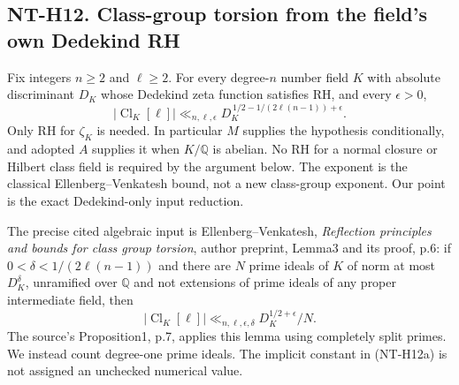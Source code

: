 \subsection*{NT-H12. Class-group torsion from the field's own Dedekind RH}
Fix integers $n\ge2$ and $\ell\ge2$. For every degree-$n$ number field
$K$ with absolute discriminant $D_K$ whose Dedekind zeta function satisfies
RH, and every $\epsilon>0$,
\[
 |\operatorname{Cl}_K[\ell]|
       \ll_{n,\ell,\epsilon}
 D_K^{\,1/2-1/(2\ell(n-1))+\epsilon}.                   \tag{NT-H12a}
\]
Only RH for $\zeta_K$ is needed. In particular $M$ supplies the hypothesis
conditionally, and adopted $A$ supplies it when $K/\mathbb Q$ is abelian.
No RH for a normal closure or Hilbert class field is required by the
argument below. The exponent is the classical Ellenberg--Venkatesh
bound, not a new class-group exponent. Our point is the exact
Dedekind-only input reduction.

The precise cited algebraic input is Ellenberg--Venkatesh,
\emph{Reflection principles and bounds for class group torsion},
author preprint, Lemma3 and its proof, p.6: if
$0<\delta<1/(2\ell(n-1))$ and there are $N$ prime ideals of $K$
of norm at most $D_K^\delta$, unramified over $\mathbb Q$ and not
extensions of prime ideals of any proper intermediate field, then
\[
 |\operatorname{Cl}_K[\ell]|
       \ll_{n,\ell,\epsilon,\delta}D_K^{1/2+\epsilon}/N.
                                                        \tag{NT-H12b}
\]
The source's Proposition1, p.7, applies this lemma using completely
split primes. We instead count degree-one prime ideals. The implicit
constant in (NT-H12a) is not assigned an unchecked numerical value.

